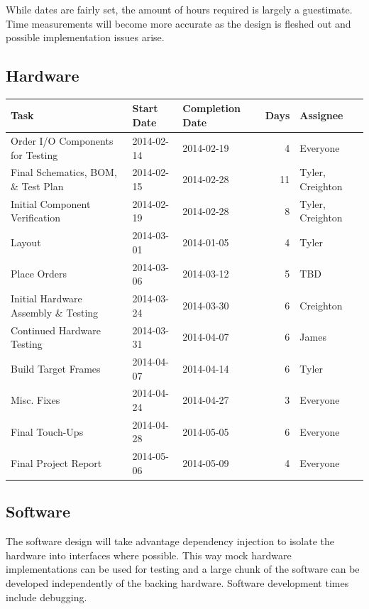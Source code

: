 \documentclass{article}
\begin{document}
While dates are fairly set, the amount of hours required is largely a guestimate.
Time measurements will become more accurate as the design is fleshed out and possible implementation issues arise.

\subsection{Hardware}

\begin{tabular}{|l|l|l|r|l|}
\hline
\textbf{Task} & \textbf{Start Date} & \textbf{Completion Date} & \textbf{Days} & \textbf{Assignee} \\
\hline
Order I/O Components for Testing & 2014-02-14 & 2014-02-19 & 4 & Everyone \\
\hline
Final Schematics, BOM, \& Test Plan & 2014-02-15 & 2014-02-28 & 11 & Tyler, Creighton \\
\hline
Initial Component Verification & 2014-02-19 & 2014-02-28 & 8 & Tyler, Creighton \\
\hline
Layout & 2014-03-01 & 2014-01-05 & 4 & Tyler \\
\hline
Place Orders & 2014-03-06 & 2014-03-12 & 5 & TBD \\
\hline
Initial Hardware Assembly \& Testing & 2014-03-24 & 2014-03-30 & 6 & Creighton \\
\hline
Continued Hardware Testing & 2014-03-31 & 2014-04-07 & 6 & James \\
\hline
Build Target Frames & 2014-04-07 & 2014-04-14 & 6 & Tyler \\
\hline
Misc. Fixes & 2014-04-24 & 2014-04-27 & 3 & Everyone \\
\hline
Final Touch-Ups & 2014-04-28 & 2014-05-05 & 6 & Everyone \\
\hline
Final Project Report & 2014-05-06 & 2014-05-09 & 4 & Everyone \\
\hline
\end{tabular}

\subsection{Software}

The software design will take advantage dependency injection to isolate the hardware into interfaces where possible.
This way mock hardware implementations can be used for testing and a large chunk of the software can be developed
independently of the backing hardware.
Software development times include debugging.
\end{document}

